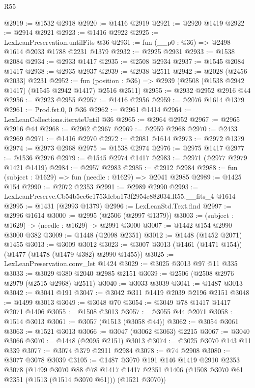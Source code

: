 \begin{lexlean}{R55}
\begin{coremodule}
{{@2919 := @1532 @2918
@2920 := @1416 @2919
@2921 := @2920 @1419
@2922 := @2914 @2921
@2923 := @1416 @2922
@2925 := LexLeanPreservation.untilFits @36
@2931 := fun (__p0 : @36) => @2498 @1614 @2033 @1788 @2231 @1379
@2932 := @2925 @2931
@2933 := @1538 @2084
@2934 := @2933 @1417
@2935 := @2508 @2934
@2937 := @1545 @2084 @1417
@2938 := @2935 @2937
@2939 := @2938 @2511
@2942 := @2028 (@2456 @2033) @2231
@2952 := fun (position : @36) => @2939 (@2508 (@1538 @2942 @1417) (@1545 @2942 @1417) @2516 @2511)
@2955 := @2932 @2952 @2916 @44
@2956 := @2923 @2955
@2957 := @1416 @2956
@2959 := @2076 @1614 @1379
@2961 := Prod.fst.{0, 0} @36
@2962 := @2961 @1414
@2964 := LexLeanCollections.iterateUntil @36
@2965 := @2964 @2952
@2967 := @2965 @2916 @44
@2968 := @2962 @2967
@2969 := @2959 @2968
@2970 := @2433 @2969
@2971 := @1416 @2970
@2972 := @2081 @1614
@2973 := @2972 @1379
@2974 := @2973 @2968
@2975 := @1538 @2974
@2976 := @2975 @1417
@2977 := @1536 @2976
@2979 := @1545 @2974 @1417
@2983 := @2971 (@2977 @2979 @1421 @1419)
@2984 := @2957 @2983
@2985 := @2912 @2984
@2988 := fun (subject : @1629) => fun (needle : @1629) => @2041 @2985
@2989 := @1425 @154
@2990 := @2072 @2353
@2991 := @2989 @2990
@2993 := LexLeanPreserve.Cb54b5ce6e1753deba173f2954c882034.R55.__fits_4 @1614
@2995 := @1431 (@2993 @1379)
@2996 := LexLeanStd.Text.find
@2997 := @2996 @1614
@3000 := @2995 (@2506 (@2997 @1379))
@3003 := (subject : @1629) -> (needle : @1629) -> @2991 @3000
@3007 := @1442 @154 @2990 @3000 @382
@3009 := @1448 (@2098 @2351)
@3012 := @1448 (@1452 @2071) @1455
@3013 := @3009 @3012
@3023 := @3007 @3013 (@1461 (@1471 @154)) (@1477 (@1478 (@1479 @382) @2990 @1455))
@3025 := LexLeanPreservation.conv_let @1424
@3029 := @3025 @3013 @97 @11 @335
@3033 := @3029 @380 @2040 @2985 @2151
@3039 := @2506 (@2508 @2976 @2979 (@2515 @2968) @2511)
@3040 := @3033 @3039
@3041 := @1487 @3013
@3042 := @3041 @191
@3047 := @3042 @311 @1419 @2039 @2196 @2151
@3048 := @1499 @3013
@3049 := @3048 @70
@3054 := @3049 @78 @1417 @1417 @2071 @1406
@3055 := @1508 @3013
@3057 := @3055 @44 @2071
@3058 := @1514 @3013
@3061 := @3057 (@1513 (@3058 @44))
@3062 := @3054 @3061
@3063 := @1521 @3013
@3066 := @3047 (@3062 @3063) @2215
@3067 := @3040 @3066
@3070 := @1448 (@2095 @2151) @3013
@3074 := @3025 @3070 @143 @11 @339
@3077 := @3074 @379 @2911 @2984
@3078 := @74 @2908
@3080 := @3077 @3078 @3039
@3105 := @1487
    @3070
    @191
    @146
    @1419
    @2910
    @2353
    @3078
    (@1499
      @3070
      @88
      @78
      @1417
      @1417
      @2351
      @1406
      (@1508 @3070 @61 @2351 (@1513 (@1514 @3070 @61)))
      (@1521 @3070))
}}
\end{coremodule}
\end{lexlean}
